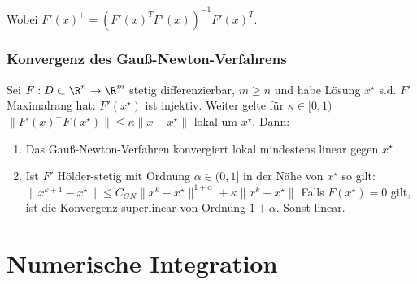 Wobei $F'(x)^+ = (F'(x)^T F'(x))^{-1} F'(x)^T$.

\subsubsection*{Konvergenz des Gauß-Newton-Verfahrens}

Sei $F : D \subset \R^n \to \R^m$ stetig differenzierbar, $m \geq n$ und habe Lösung $x^\star$ s.d. $F'$ Maximalrang hat: $F'(x^\star)$ ist injektiv. Weiter gelte für $\kappa \in [0,1)$ $\|F'(x)^+ F(x^\star)\| \leq \kappa \|x-x^\star\|$ lokal um $x^\star$. Dann:

\begin{enumerate}[label=(\alph*)]
	\item Das Gauß-Newton-Verfahren konvergiert lokal mindestens linear gegen $x^\star$ 
	\item Ist $F'$ Hölder-stetig mit Ordnung $\alpha \in (0,1]$ in der Nähe von $x^\star$ so gilt: \\ $\|x^{k+1}-x^\star\| \leq C_{GN}\|x^k-x^\star\|^{1+\alpha} + \kappa\|x^k-x^\star\|$ Falls $F(x^\star) = 0$ gilt, ist die Konvergenz superlinear von Ordnung $1+\alpha$. Sonst linear.
\end{enumerate}

\section*{Numerische Integration}
